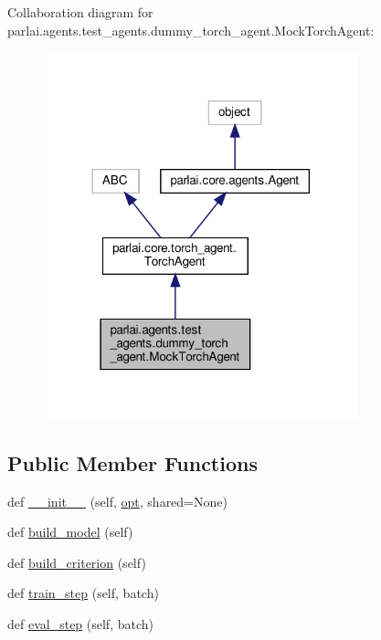 Collaboration diagram for parlai.\+agents.\+test\+\_\+agents.\+dummy\+\_\+torch\+\_\+agent.\+Mock\+Torch\+Agent\+:
\nopagebreak
\begin{figure}[H]
\begin{center}
\leavevmode
\includegraphics[width=258pt]{d0/d8a/classparlai_1_1agents_1_1test__agents_1_1dummy__torch__agent_1_1MockTorchAgent__coll__graph}
\end{center}
\end{figure}
\subsection*{Public Member Functions}
\begin{DoxyCompactItemize}
\item 
def \hyperlink{classparlai_1_1agents_1_1test__agents_1_1dummy__torch__agent_1_1MockTorchAgent_af14024f59e4ea3dea5c7ff38caff89ad}{\+\_\+\+\_\+init\+\_\+\+\_\+} (self, \hyperlink{classparlai_1_1core_1_1torch__agent_1_1TorchAgent_a785bb920cf8c8afc3e9bf6a8b77e335a}{opt}, shared=None)
\item 
def \hyperlink{classparlai_1_1agents_1_1test__agents_1_1dummy__torch__agent_1_1MockTorchAgent_a8d6b885ba3adcee439eab49922e584a4}{build\+\_\+model} (self)
\item 
def \hyperlink{classparlai_1_1agents_1_1test__agents_1_1dummy__torch__agent_1_1MockTorchAgent_a457b269132e6c4ec92308ce87aa85336}{build\+\_\+criterion} (self)
\item 
def \hyperlink{classparlai_1_1agents_1_1test__agents_1_1dummy__torch__agent_1_1MockTorchAgent_a867115faed3455518fb1f9a0ab41f761}{train\+\_\+step} (self, batch)
\item 
def \hyperlink{classparlai_1_1agents_1_1test__agents_1_1dummy__torch__agent_1_1MockTorchAgent_aea8dfe6e44a419f31e741c4770a82f9b}{eval\+\_\+step} (self, batch)
\end{DoxyCompactItemize}
